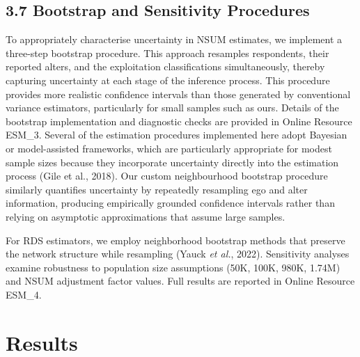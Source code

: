 \documentclass[
  12pt,
  letterpaper,
  DIV=11,
  numbers=noendperiod]{scrartcl}
\begin{document}
\subsection{3.7 Bootstrap and Sensitivity
Procedures}\label{bootstrap-and-sensitivity-procedures}

To appropriately characterise uncertainty in NSUM estimates, we
implement a three-step bootstrap procedure. This approach resamples
respondents, their reported alters, and the exploitation classifications
simultaneously, thereby capturing uncertainty at each stage of the
inference process. This procedure provides more realistic confidence
intervals than those generated by conventional variance estimators,
particularly for small samples such as ours. Details of the bootstrap
implementation and diagnostic checks are provided in Online Resource
ESM\_3. Several of the estimation procedures implemented here adopt
Bayesian or model-assisted frameworks, which are particularly
appropriate for modest sample sizes because they incorporate uncertainty
directly into the estimation process (Gile et al., 2018). Our custom
neighbourhood bootstrap procedure similarly quantifies uncertainty by
repeatedly resampling ego and alter information, producing empirically
grounded confidence intervals rather than relying on asymptotic
approximations that assume large samples.

For RDS estimators, we employ neighborhood bootstrap methods that
preserve the network structure while resampling (Yauck \emph{et al.},
2022). Sensitivity analyses examine robustness to population size
assumptions (50K, 100K, 980K, 1.74M) and NSUM adjustment factor values.
Full results are reported in Online Resource ESM\_4.

\section{Results}\label{results}
\end{document}
